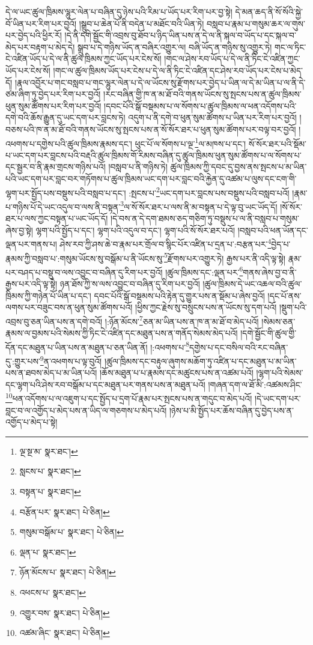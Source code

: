 དེ་ལ་ཡང་ཚུལ་ཁྲིམས་ལྷུར་ལེན་པ་བཞིན་དུ་ཉེས་པའི་རིམ་པ་ཡོད་པར་རིག་པར་བྱ་སྟེ། དེ་མན་ཆད་ནི་སོ་སོའི་སྐྱེ་བོ་ཡིན་པར་རིག་པར་བྱའོ། །སྒྲུབ་པ་ཆེན་པོ་ནི་བདེན་པ་མཐོང་བའི་ཡིན་ཏེ། བསླབ་པ་རྣམ་པ་གསུམ་ཆར་ལ་གུས་པར་བྱེད་པའི་ཕྱིར་རོ། །དེ་ནི་དགེ་སྦྱོང་གི་འབྲས་བུ་ཐོབ་པ་ཉིད་ཡིན་པས་ན་དེ་ལ་ནི་སྐལ་བ་ཡོད་པ་དང་སྐལ་བ་མེད་པར་བརྟག་པ་མེད་དེ། སྒྲུབ་པ་དེ་གཉིས་ཡོད་ན་བཞིར་འགྱུར་ལ། བཞི་ཡོད་ན་གཉིས་སུ་འགྱུར་ཏེ། གང་ལ་ཏིང་ངེ་འཛིན་ཡོད་པ་དེ་ལ་ནི་ཚུལ་ཁྲིམས་ཀྱང་ཡོད་པར་ངེས་སོ། །གང་ལ་ཤེས་རབ་ཡོད་པ་དེ་ལ་ནི་ཏིང་ངེ་འཛིན་ཀྱང་ཡོད་པར་ངེས་སོ། །གང་ལ་ཚུལ་ཁྲིམས་ཡོད་པར་ངེས་པ་དེ་ལ་ནི་ཏིང་ངེ་འཛིན་དང་ཤེས་རབ་ཡོད་པར་ངེས་པ་མེད་དོ། །རྣལ་འབྱོར་པ་གང་བསླབ་པ་གང་ལྷུར་ལེན་པ་དེ་ལ་ཡོངས་སུ་རྫོགས་པར་བྱེད་པ་ཡིན་ལ་དེ་མ་ཡིན་པ་ལ་ནི་དེ་ཙམ་ཞིག་ཏུ་བྱེད་པར་རིག་པར་བྱའོ། །རང་བཞིན་གྱི་ཁ་ན་མ་ཐོ་བའི་གནས་ཡོངས་སུ་སྤངས་པས་ན་ཚུལ་ཁྲིམས་ཕུན་སུམ་ཚོགས་པར་རིག་པར་བྱའོ། །དབང་པོའི་སྒོ་བསྡམས་པ་ལ་སོགས་པ་ཚུལ་ཁྲིམས་ལ་ཕན་འདོགས་པའི་དགེ་བའི་ཆོས་རྒྱུན་དུ་ཡང་དག་པར་བླངས་ཏེ། འདུག་པ་ནི་དགེ་བ་ཕུན་སུམ་ཚོགས་པ་ཡིན་པར་རིག་པར་བྱའོ། །བཅས་པའི་ཁ་ན་མ་ཐོ་བའི་གནས་ཡོངས་སུ་སྤངས་པས་ན་སོ་སོར་ཐར་པ་ཕུན་སུམ་ཚོགས་པར་བལྟ་བར་བྱའོ། །འཕགས་པ་དགྱེས་པའི་ཚུལ་ཁྲིམས་རྣམས་དང་། ཕུང་པོ་ལ་སོགས་པ་ལྔ་\footnote{ལྔ་སྔ་མ་  སྣར་ཐང་། }ལ་མཁས་པ་དང་། སོ་སོར་ཐར་པའི་སྡོམ་པ་ཡང་དག་པར་བླངས་པའི་བརྡའི་ཚུལ་ཁྲིམས་གོ་རིམས་བཞིན་དུ་ཚུལ་ཁྲིམས་ཕུན་སུམ་ཚོགས་པ་ལ་སོགས་པ་དང་སྦྱར་བ་ནི་རྣམ་གྲངས་གཉིས་པའོ། །བསླབ་པ་ནི་གཉིས་ཏེ། ཚུལ་ཁྲིམས་ཀྱི་དབང་དུ་བྱས་ནས་སྤངས་པ་མ་ཡིན་པའི་ཡང་དག་པར་བླང་བར་གཏོགས་པ་ཚུལ་ཁྲིམས་ཡང་དག་པར་བླང་བའི་རྐྱེན་དུ་འཚམ་པ་ལུས་དང་ངག་གི་ལྷག་པར་སྤྱོད་པས་བསྡུས་པའི་བསླབ་པ་དང་། :སྤངས་པ་\footnote{སླངས་པ་  སྣར་ཐང་། }ཡང་དག་པར་བླངས་པས་བསྡུས་པའི་བསླབ་པའོ། །རྣམ་པ་གཉིས་པོ་དེ་ཡང་འདུལ་བ་ལས་ནི་བསྟན་\footnote{བསྟན་པ་  སྣར་ཐང་། }ལ་སོ་སོར་ཐར་པ་ལས་ནི་མ་བསྟན་པ་དེ་ལྟ་བུ་ཡང་ཡོད་དོ། །སོ་སོར་ཐར་པ་ལས་ཀྱང་བསྟན་པ་ཡང་ཡོད་དོ། །དེ་བས་ན་དེ་དག་ཐམས་ཅད་གཅིག་ཏུ་བསྡུས་པ་ལ་ནི་བསླབ་པ་གསུམ་ཞེས་བྱ་སྟེ། ལྷག་པའི་སྤྱོད་པ་དང་། ལྷག་པའི་འདུལ་བ་དང་། ལྷག་པའི་སོ་སོར་ཐར་པའོ། །བསླབ་པའི་ཕན་ཡོན་དང་ལྡན་པར་གནས་པ། ཤེས་རབ་ཀྱི་ཤས་ཆེ་བ་རྣམ་པར་གྲོལ་བ་སྙིང་པོར་འཛིན་པ་དྲན་པ་:བརྩན་པར་\footnote{བརྩོན་པར་  སྣར་ཐང་།  པེ་ཅིན། }བྱེད་པ་རྣམས་ཀྱི་བསླབ་པ་:གསུམ་ཡོངས་སུ་བསྒོམ་པ་ནི་ཡོངས་སུ་\footnote{གསུམ་བསྒོམ་པ་  སྣར་ཐང་།  པེ་ཅིན། }རྫོགས་པར་འགྱུར་ཏེ། རྒྱས་པར་ནི་འདི་ལྟ་སྟེ། རྣམ་པར་བཤད་པ་བསྡུ་བ་ལས་འབྱུང་བ་བཞིན་དུ་རིག་པར་བྱའོ། །ཚུལ་ཁྲིམས་དང་:ལྡན་པར་\footnote{ལྡན་པ་  སྣར་ཐང་། }གནས་ཞེས་བྱ་བ་ནི་རྒྱས་པར་འདི་ལྟ་སྟེ། ཉན་ཐོས་ཀྱི་ས་ལས་འབྱུང་བ་བཞིན་དུ་རིག་པར་བྱའོ། །ཚུལ་ཁྲིམས་དེ་ཡང་འཆལ་བའི་ཚུལ་ཁྲིམས་ཀྱི་གཉེན་པོ་ཡིན་པ་དང་། དབང་པོའི་སྒོ་བསྡམས་པའི་རྟེན་དུ་གྱུར་པས་ན་སྡོམ་པ་ཞེས་བྱའོ། །དང་པོ་ནས་ལགས་པར་བཟུང་བས་ན་ཕུན་སུམ་ཚོགས་པའོ། །ཕྱིས་ཀྱང་རྗེས་སུ་བསྲུངས་པས་ན་ཡོངས་སུ་དག་པའོ། །སྡུག་པའི་འབྲས་བུ་ཅན་ཡིན་པས་ན་དགེ་བའོ། །:ཉོན་མོངས་\footnote{ཉོན་མོངས་པ་  སྣར་ཐང་།  པེ་ཅིན། }ཅན་མ་ཡིན་པས་ན་ཁ་ན་མ་ཐོ་བ་མེད་པའོ། །སེམས་ཅན་རྣམས་ལ་བྱམས་པའི་སེམས་ཀྱི་ཏིང་ངེ་འཛིན་དང་མཐུན་པས་ན་གནོད་སེམས་མེད་པའོ། །དགེ་སྦྱོང་གི་ཚུལ་གྱི་དོན་དང་མཐུན་པ་ཡིན་པས་ན་མཐུན་པ་ཅན་ཡིན་ནོ། །:འཕགས་པ་\footnote{འཕངས་པ་  སྣར་ཐང་། }དགྱེས་པ་དང་བསིལ་བའི་རང་བཞིན་དུ་:གྱུར་པས་\footnote{འགྱུར་བས་  སྣར་ཐང་།  པེ་ཅིན། }ན་འཕགས་པ་ལྟ་བུའོ། །ཚུལ་ཁྲིམས་དང་བརྟུལ་ཞུགས་མཆོག་ཏུ་འཛིན་པ་དང་མཐུན་པ་མ་ཡིན་པས་ན་ཐབས་མེད་པ་མ་ཡིན་པའོ། །ཆོས་མཐུན་པ་པ་རྣམས་དང་མཚུངས་པས་ན་འཚམ་པའོ། །ལྷག་པའི་སེམས་དང་ལྷག་པའི་ཤེས་རབ་བསྒོམ་པ་དང་མཐུན་པར་གནས་པས་ན་མཐུན་པའོ། །གཞན་དག་ལ་ཐོ་མི་:འཚམས་ཤིང་\footnote{འཚམ་ཞིང་  སྣར་ཐང་།  པེ་ཅིན། }ཕན་འདོགས་པ་ལ་འཇུག་པ་དང་སྤྱོད་པ་དྲག་པོ་རྣམ་པར་སྤངས་པས་ན་གདུང་བ་མེད་པའོ། །དེ་ཡང་དག་པར་བླང་བ་ལ་འགྱོད་པ་མེད་པས་ན་ཡིད་ལ་གཅགས་པ་མེད་པའོ། །ཉེས་པ་མི་སྤྱོད་པར་ཆོས་བཞིན་དུ་བྱེད་པས་ན་འགྱོད་པ་མེད་པ་སྟེ། 